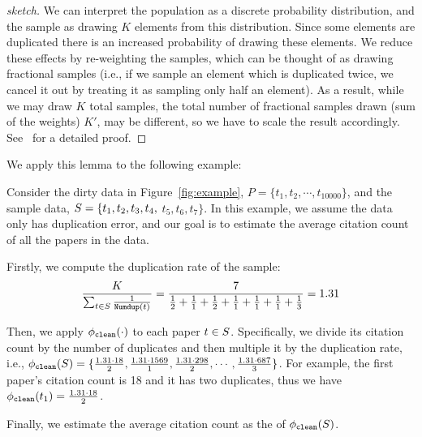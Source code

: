 \begin{proof}[sketch] We can interpret the population as a discrete probability distribution, and the sample as drawing $K$ elements from this distribution.
Since some elements are duplicated there is an increased probability of drawing these elements.
We reduce these effects by re-weighting the samples, which can be thought of as drawing fractional samples (i.e., if we sample an element which is duplicated twice, we cancel it out by treating it as sampling only half an element).
As a result, while we may draw $K$ total samples, the total number of fractional samples drawn (sum of the weights) $K'$,
may be different, so we have to scale the result accordingly. See~\cite{saqpfull} for a detailed proof.
\end{proof}
We apply this lemma to the following example:
\begin{example}\label{exa:derror}
Consider the dirty data in Figure~\ref{fig:example}, $P = \{t_1, t_2, \cdots, t_{10000}\}$, and the sample data, $\Sset = \{t_1, t_2, t_3, t_4,$ $t_5, t_6, t_7\}$. In this example, we assume the data only has duplication error, and our goal is to estimate the average citation count of all the papers in the data. 

Firstly, we compute the duplication rate of the sample: 
\[\frac{K}{\sum_{t\in S} \frac{1}{\Dedup{t}{P}}} = \frac{7}{\frac{1}{2}+\frac{1}{1}+\frac{1}{2}+\frac{1}{1}+\frac{1}{1}+\frac{1}{1}+\frac{1}{3}} = 1.31\]

Then, we apply $\saqpplusfunc(\cdot)$ to each paper $t\in \Sset$. Specifically, we divide its citation count by the number of duplicates and then multiple it by the duplication rate, i.e., $\saqpplusfunc(S) = \{\frac{1.31\cdot 18}{2}, \frac{1.31\cdot1569}{1}, \frac{1.31\cdot298}{2}, \cdots , \frac{1.31\cdot687}{3}\}$. For example, the first paper's citation count is 18 and it has two duplicates, thus we have $\saqpplusfunc(t_1) = \frac{1.31\cdot 18}{2}$. 


Finally, we estimate the average citation count as the \mean of $\saqpplusfunc(S)$.



\end{example}

